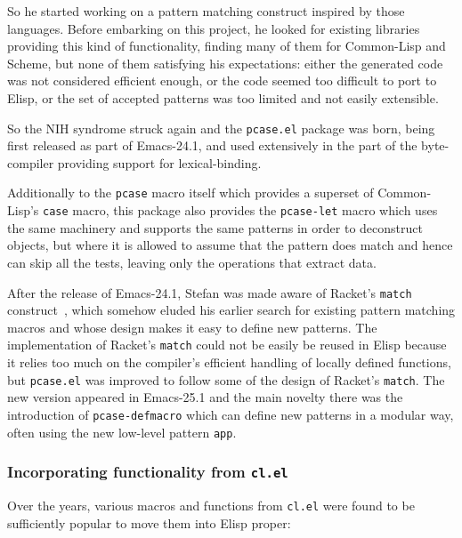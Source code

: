 \documentclass[format=acmsmall, review=false, screen=true]{acmart}
\newcommand \Elisp {Elisp}
\begin{document}
So he started working on a pattern matching construct inspired by those
languages.  Before embarking on this project, he looked for existing
libraries providing this kind of functionality, finding many of them for
Common-Lisp and Scheme, but none of them satisfying his expectations: either
the generated code was not considered efficient enough, or the code seemed
too difficult to port to \Elisp{}, or the set of accepted patterns was too
limited and not easily extensible.

So the NIH syndrome struck again and the \texttt{pcase.el} package was born,
being first released as part of Emacs-24.1, and used extensively in the part
of the byte-compiler providing support for lexical-binding.

Additionally to the \texttt{pcase} macro itself which provides a superset of
Common-Lisp's \texttt{case} macro, this package also provides the
\texttt{pcase-let} macro which uses the same machinery and supports the same
patterns in order to deconstruct objects, but where it is allowed to assume
that the pattern does match and hence can skip all the tests, leaving only the
operations that extract data.

After the release of Emacs-24.1, Stefan was made aware of Racket's
\texttt{match} construct~\cite{RacketReference2018}, which somehow eluded his earlier search for
existing pattern matching macros and whose design makes it easy to define
new patterns.  The implementation of Racket's \texttt{match} could not be
easily be reused in \Elisp{} because it relies too much on the compiler's
efficient handling of locally defined functions, but \texttt{pcase.el} was
improved to follow some of the design of Racket's \texttt{match}.
The new version appeared in Emacs-25.1 and the main novelty there was the
introduction of \texttt{pcase-defmacro} which can define new patterns
in a modular way, often using the new low-level pattern \texttt{app}.

\subsubsection{Incorporating functionality from \texttt{cl.el}}

Over the years, various macros and functions from \texttt{cl.el} were found
to be sufficiently popular to move them into \Elisp{} proper:
\end{document}
